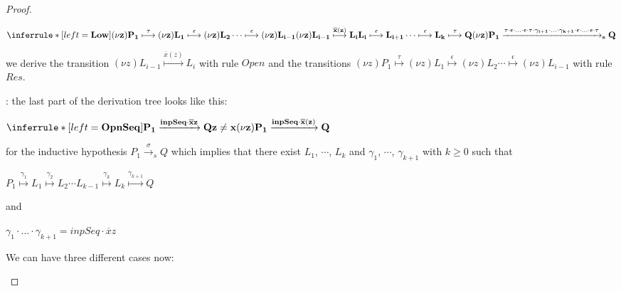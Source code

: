 \begin{proposition}
\begin{proof}
\begin{description}
\begin{description}
\begin{center}
	      $\inferrule* [left=\bf{Low}]{
		  (\nu z)P_{1}\stackrel{\tau}{\longmapsto} (\nu z)L_{1}
			      \stackrel{\epsilon}{\longmapsto} (\nu z)L_{2}
		  \cdots
			      \stackrel{\epsilon}{\longmapsto} (\nu z) L_{i-1}
		\\
		(\nu z) L_{i-1} \stackrel{\overline{x}(z)}{\longmapsto} L_{i}
		\\
			      L_{i} \stackrel{\epsilon}{\longmapsto} L_{i+1}
		  \cdots 
			      \stackrel{\epsilon}{\longmapsto} L_{k}
			      \stackrel{\tau}{\longmapsto} Q
	      }{
		(\nu z)P_{1} \xrightarrow{\tau \cdot \epsilon \cdot \ldots \cdot \epsilon \cdot \tau \cdot \gamma_{i+1}\cdot \ldots \cdot \gamma_{k+1} \cdot \epsilon \cdot \ldots \cdot \epsilon \cdot \tau}_{s} Q
	      }$	  
	    \end{center}
	    we derive the transition $ (\nu z) L_{i-1} \stackrel{\overline{x}(z)}{\longmapsto} L_{i}$ with rule $Open$ and the transitions $(\nu z)P_{1}\stackrel{\tau}{\longmapsto}(\nu z)L_{1} \stackrel{\epsilon}{\longmapsto} (\nu z)L_{2}\cdots \stackrel{\epsilon}{\longmapsto} (\nu z) L_{i-1}$ with rule $Res$.
	\end{description}
      \item[$OpnSeq$]: 
	the last part of the derivation tree looks like this:
	\begin{center}
	  $\inferrule* [left=\bf{OpnSeq}]{
	      P_{1} \xrightarrow{inpSeq \cdot \overline{x}z} Q
	    \\ 
	      z\neq x
	  }{
	      (\nu z)P_{1} \xrightarrow{inpSeq \cdot \overline{x}(z)} Q
	  }$	 
	\end{center}
	for the inductive hypothesis $P_{1} \xrightarrow{\sigma}_{s} Q$ which implies that there exist $L_{1}$, $\cdots$, $L_{k}$ and $\gamma_{1}$, $\cdots$, $\gamma_{k+1}$ with $k\geq 0$ such that 
	\begin{center}
	  $P_{1} \stackrel{\gamma_{1}}{\longmapsto} L_{1}  \stackrel{\gamma_{2}}{\longmapsto} L_{2} \cdots L_{k-1} \stackrel{\gamma_{k}}{\longmapsto} L_{k} \stackrel{\gamma_{k+1}}{\longmapsto} Q$ 
	\end{center}
	and 
	\begin{center}
	  $\gamma_{1} \cdot \ldots \cdot \gamma_{k+1} =  inpSeq \cdot \overline{x}z$
	\end{center}
	We can have three different cases now: 
\end{description}
\end{proof}
\end{proposition}
